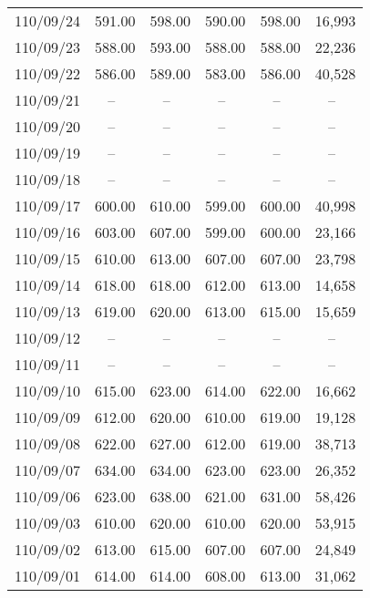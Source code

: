 \begin{longtable}{@{}cccccc@{}}
110/09/24 & 591.00    & 598.00    & 590.00    & 598.00    & 16,993    \\
110/09/23 & 588.00    & 593.00    & 588.00    & 588.00    & 22,236    \\
110/09/22 & 586.00    & 589.00    & 583.00    & 586.00    & 40,528    \\
\rowcolor{gray(x11gray)}
110/09/21 & --~       & --~       & --~       & --~       & --~       \\
\rowcolor{gray(x11gray)}
110/09/20 & --~       & --~       & --~       & --~       & --~       \\
\rowcolor{gray(x11gray)}
110/09/19 & --~       & --~       & --~       & --~       & --~       \\
\rowcolor{gray(x11gray)}
110/09/18 & --~       & --~       & --~       & --~       & --~       \\
110/09/17 & 600.00    & 610.00    & 599.00    & 600.00    & 40,998    \\
110/09/16 & 603.00    & 607.00    & 599.00    & 600.00    & 23,166    \\
110/09/15 & 610.00    & 613.00    & 607.00    & 607.00    & 23,798    \\
110/09/14 & 618.00    & 618.00    & 612.00    & 613.00    & 14,658    \\
110/09/13 & 619.00    & 620.00    & 613.00    & 615.00    & 15,659    \\
\rowcolor{gray(x11gray)}
110/09/12 & --~       & --~       & --~       & --~       & --~       \\
\rowcolor{gray(x11gray)}
110/09/11 & --~       & --~       & --~       & --~       & --~       \\
110/09/10 & 615.00    & 623.00    & 614.00    & 622.00    & 16,662    \\
110/09/09 & 612.00    & 620.00    & 610.00    & 619.00    & 19,128    \\
110/09/08 & 622.00    & 627.00    & 612.00    & 619.00    & 38,713    \\
110/09/07 & 634.00    & 634.00    & 623.00    & 623.00    & 26,352    \\
110/09/06 & 623.00    & 638.00    & 621.00    & 631.00    & 58,426    \\
110/09/03 & 610.00    & 620.00    & 610.00    & 620.00    & 53,915    \\
110/09/02 & 613.00    & 615.00    & 607.00    & 607.00    & 24,849    \\
110/09/01 & 614.00    & 614.00    & 608.00    & 613.00    & 31,062    \\

\end{longtable}

